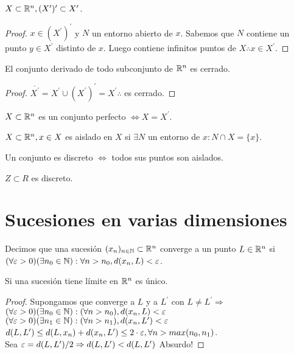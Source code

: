 \begin{prop}
  $X \subset \mathbb{R}^n, (X^{\prime})^{\prime} \subset X^{\prime}$.
  \begin{proof}
    $x \in (X^{\prime})^{\prime}$ y $N$ un entorno abierto de $x$. Sabemos que $N$ contiene un punto $y \in X^{\prime}$ distinto de $x$. Luego contiene infinitos puntos de $X \therefore x \in X^{\prime}$.
  \end{proof}
\end{prop}

\begin{corollary}
  El conjunto derivado de todo subconjunto de $\mathbb{R}^n$ es cerrado.
  \begin{proof}
    $\overline{X^{\prime}} = X^{\prime} \cup (X^{\prime})^{\prime} = X^{\prime} \therefore$ es cerrado.
  \end{proof}
\end{corollary}

\begin{definition}
  $X \subset \mathbb{R}^n$ es un conjunto perfecto $\iff X = X^{\prime}$.
\end{definition}

\begin{definition}
  $X \subset \mathbb{R}^n, x \in X$ es aislado en $X$ si $\exists N$ un entorno de $x : N \cap X = \{x\}$.
\end{definition}

\begin{definition}
  Un conjunto es discreto $\iff$ todos sus puntos son aislados.
\end{definition}

\begin{eg}
  $Z \subset R$ es discreto.
\end{eg}

\section{Sucesiones en varias dimensiones}

Decimos que una sucesión $(x_n)_{n \in \mathbb{N}} \subset \mathbb{R}^n$ converge a un punto $L \in \mathbb{R}^n$ si $(\forall \varepsilon > 0)(\exists n_0 \in \mathbb{N}) : \forall n > n_0, d(x_n, L) < \varepsilon$.

\begin{lemma}
  Si una sucesión tiene límite en $\mathbb{R}^n$ es único.
  \begin{proof}
    Supongamos que converge a $L$ y a $L^{\prime}$ con $L \neq L^{\prime} \Rightarrow$ \\
    $(\forall \varepsilon > 0)(\exists n_0 \in \mathbb{N}) : (\forall n > n_0), d(x_n, L) < \varepsilon$ \\
    $(\forall \varepsilon > 0)(\exists n_1 \in \mathbb{N}) : (\forall n > n_1), d(x_n, L^{\prime}) < \varepsilon$ \\
    $d(L, L^{\prime}) \leq d(L, x_n) + d(x_n, L^{\prime}) \leq 2 \cdot \varepsilon, \forall n > max(n_0, n_1)$. \\
    Sea $\varepsilon = d(L, L^{\prime})/2 \Rightarrow d(L, L^{\prime}) < d(L, L^{\prime})$ Absurdo!
  \end{proof}
\end{lemma}

